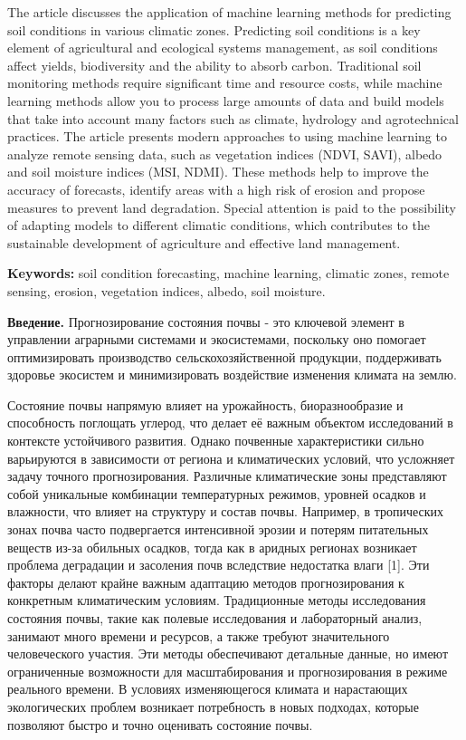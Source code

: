The article discusses the application of machine learning methods for
predicting soil conditions in various climatic zones. Predicting soil
conditions is a key element of agricultural and ecological systems
management, as soil conditions affect yields, biodiversity and the
ability to absorb carbon. Traditional soil monitoring methods require
significant time and resource costs, while machine learning methods
allow you to process large amounts of data and build models that take
into account many factors such as climate, hydrology and agrotechnical
practices. The article presents modern approaches to using machine
learning to analyze remote sensing data, such as vegetation indices
(NDVI, SAVI), albedo and soil moisture indices (MSI, NDMI). These
methods help to improve the accuracy of forecasts, identify areas with a
high risk of erosion and propose measures to prevent land degradation.
Special attention is paid to the possibility of adapting models to
different climatic conditions, which contributes to the sustainable
development of agriculture and effective land management.

{\bfseries Keywords:} soil condition forecasting, machine learning,
climatic zones, remote sensing, erosion, vegetation indices, albedo,
soil moisture.

{\bfseries Введение.} Прогнозирование состояния почвы - это ключевой
элемент в управлении аграрными системами и экосистемами, поскольку оно
помогает оптимизировать производство сельскохозяйственной продукции,
поддерживать здоровье экосистем и минимизировать воздействие изменения
климата на землю.

Состояние почвы напрямую влияет на урожайность, биоразнообразие и
способность поглощать углерод, что делает её важным объектом
исследований в контексте устойчивого развития. Однако почвенные
характеристики сильно варьируются в зависимости от региона и
климатических условий, что усложняет задачу точного прогнозирования.
Различные климатические зоны представляют собой уникальные комбинации
температурных режимов, уровней осадков и влажности, что влияет на
структуру и состав почвы. Например, в тропических зонах почва часто
подвергается интенсивной эрозии и потерям питательных веществ из-за
обильных осадков, тогда как в аридных регионах возникает проблема
деградации и засоления почв вследствие недостатка влаги {[}1{]}. Эти
факторы делают крайне важным адаптацию методов прогнозирования к
конкретным климатическим условиям. Традиционные методы исследования
состояния почвы, такие как полевые исследования и лабораторный анализ,
занимают много времени и ресурсов, а также требуют значительного
человеческого участия. Эти методы обеспечивают детальные данные, но
имеют ограниченные возможности для масштабирования и прогнозирования в
режиме реального времени. В условиях изменяющегося климата и нарастающих
экологических проблем возникает потребность в новых подходах, которые
позволяют быстро и точно оценивать состояние почвы.

